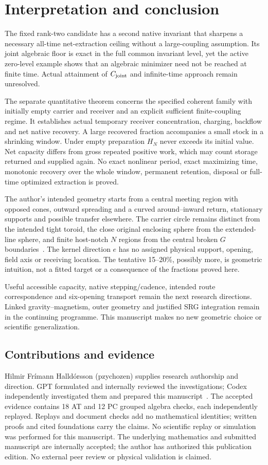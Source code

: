 \section{Interpretation and conclusion}\label{sec:conclusion}
The fixed rank-two candidate has a second native invariant that sharpens a necessary all-time net-extraction ceiling without a large-coupling assumption. Its joint algebraic floor is exact in the full common invariant level, yet the active zero-level example shows that an algebraic minimizer need not be reached at finite time. Actual attainment of $C_{\rm joint}$ and infinite-time approach remain unresolved.

The separate quantitative theorem concerns the specified coherent family with initially empty carrier and receiver and an explicit sufficient finite-coupling regime. It establishes actual temporary receiver concentration, charging, backflow and net native recovery. A large recovered fraction accompanies a small stock in a shrinking window. Under empty preparation $H_N$ never exceeds its initial value. Net capacity differs from gross repeated positive work, which may count storage returned and supplied again. No exact nonlinear period, exact maximizing time, monotonic recovery over the whole window, permanent retention, disposal or full-time optimized extraction is proved.

The author's intended geometry starts from a central meeting region with opposed cones, outward spreading and a curved around--inward return, stationary supports and possible transfer elsewhere. The carrier circle remains distinct from the intended tight toroid, the close original enclosing sphere from the extended-line sphere, and finite host-notch $N$ regions from the central broken $G$ boundaries~\cite[Section 8]{p1}. The kernel direction $e$ has no assigned physical support, opening, field axis or receiving location. The tentative 15--20\%, possibly more, is geometric intuition, not a fitted target or a consequence of the fractions proved here.

Useful accessible capacity, native stepping/cadence, intended route correspondence and six-opening transport remain the next research directions. Linked gravity--magnetism, outer geometry and justified SRG integration remain in the continuing programme. This manuscript makes no new geometric choice or scientific generalization.

\subsection*{Contributions and evidence}
Hilmir Fr\'imann Halld\'orsson (pzychozen) supplies research authorship and direction. GPT formulated and internally reviewed the investigations; Codex independently investigated them and prepared this manuscript~\cite{at,pc,atreview,pcreview}. The accepted evidence contains 18 AT and 12 PC grouped algebra checks, each independently replayed. Replays and document checks add no mathematical identities; written proofs and cited foundations carry the claims. No scientific replay or simulation was performed for this manuscript. The underlying mathematics and submitted manuscript are internally accepted; the author has authorized this publication edition. No external peer review or physical validation is claimed.
